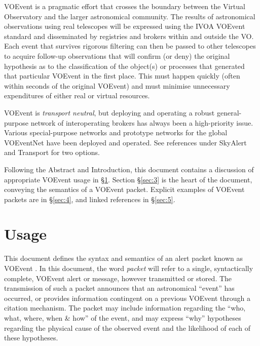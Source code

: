 \documentclass[11pt,a4paper]{ivoa}
\begin{document}
VOEvent is a pragmatic effort that crosses the boundary between the Virtual Observatory and the larger astronomical community. The results of astronomical observations using real telescopes will be expressed using the IVOA VOEvent standard and disseminated by registries and brokers within and outside the VO. Each event that survives rigorous filtering can then be passed to other telescopes to acquire follow-up observations that will confirm (or deny) the original hypothesis as to the classification of the object(s) or processes that generated that particular VOEvent in the first place. This must happen quickly (often within seconds of the original VOEvent) and must minimise unnecessary expenditures of either real or virtual resources. 

VOEvent is \emph{transport neutral}, but deploying and operating a robust general-purpose network of interoperating brokers has always been a high-priority issue. Various special-purpose networks and prototype networks for the global VOEventNet have been deployed and operated. See references under SkyAlert \citep{bib05} and Transport \citep{bib33} for two options. 

Following the Abstract and Introduction, this document contains a discussion of appropriate VOEvent usage in \S\ref{sec:2}. Section \S\ref{sec:3} is the heart of the document, conveying the semantics of a VOEvent packet. Explicit examples of VOEvent packets are in \S\ref{sec:4}, and linked references in \S\ref{sec:5}. 

\section{Usage}
\label{sec:2}
This document defines the syntax and semantics of an alert packet known as VOEvent \citep{2011ivoa.spec.0711S}. In this document, the word \emph{packet} will refer to a single, syntactically complete, VOEvent alert or message, however transmitted or stored. The transmission of such a packet announces that an astronomical ``event'' has occurred, or provides information contingent on a previous VOEvent through a citation mechanism. The packet may include information regarding the ``who, what, where, when \& how'' of the event, and may express ``why'' hypotheses regarding the physical cause of the observed event and the likelihood of each of these hypotheses. 
\end{document}
